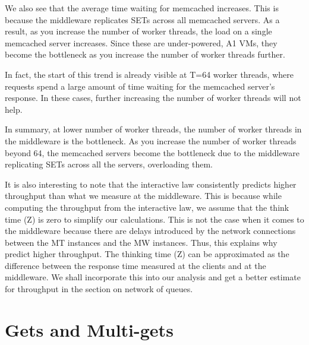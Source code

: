 \documentclass[11pt,a4paper]{article}
\newcommand\instructions[1]{\textcolor{blue}{Instructions: #1}}
\begin{document}
We also see that the average time waiting for memcached increases. This is because the middleware replicates SETs across all memcached servers. As a result, as you increase the number of worker threads, the load on a single memcached server increases. Since these are under-powered, A1 VMs, they become the bottleneck as you increase the number of worker threads further. 

In fact, the start of this trend is already visible at T=64 worker threads, where requests spend a large amount of time waiting for the memcached server's response. In these cases, further increasing the number of worker threads will not help. 

In summary, at lower number of worker threads, the number of worker threads in the middleware is the bottleneck. As you increase the number of worker threads beyond 64, the memcached servers become the bottleneck due to the middleware replicating SETs across all the servers, overloading them.

It is also interesting to note that the interactive law consistently predicts higher throughput than what we measure at the middleware. This is because while computing the throughput from the interactive law, we assume that the think time (Z) is zero to simplify our calculations. This is not the case when it comes to the middleware because there are delays introduced by the network connections between the MT instances and the MW instances. Thus, this explains why predict higher throughput. The thinking time (Z) can be approximated as the difference between the response time measured at the clients and at the middleware. We shall incorporate this into our analysis and get a better estimate for throughput in the section on network of queues.



\section{Gets and Multi-gets} %

\end{document}
